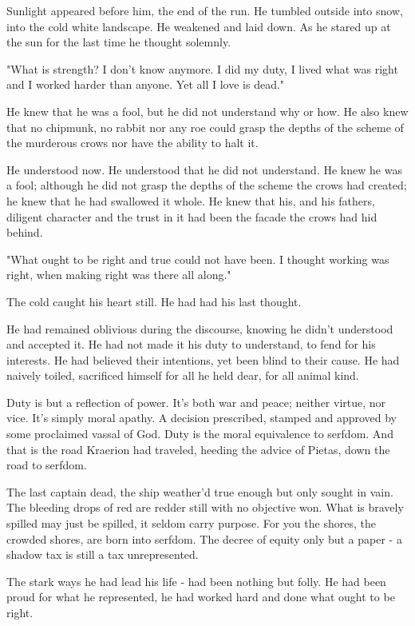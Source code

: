 \documentclass[smalldemyvopaper,11pt,twoside,onecolumn,openright,extrafontsizes]{memoir}
\newlength\drop
\begin{document}
Sunlight appeared before him, the end of the run. He tumbled outside into snow, into the cold white landscape. He weakened and laid down. As he stared up at the sun for the last time he thought solemnly.

"What is strength? I don't know anymore. I did my duty, I lived what was right and I worked harder than anyone. Yet all I love is dead."

He knew that he was a fool, but he did not understand why or how. He also knew that no chipmunk, no rabbit nor any roe could grasp the depths of the scheme of the murderous crows nor have the ability to halt it.

He understood now. He understood that he did not understand. He knew he was a fool; although he did not grasp the depths of the scheme the crows had created; he knew that he had swallowed it whole. 
He knew that his, and his fathers, diligent character and the trust in it had been the facade the crows had hid behind.

"What ought to be right and true could not have been. I thought working was right, when making right was there all along."

The cold caught his heart still. He had had his last thought. 

He had remained oblivious during the discourse, knowing he didn't understood and accepted it. He had not made it his duty to understand, to fend for his interests. He had believed their intentions, yet been blind to their cause. He had naively toiled, sacrificed himself for all he held dear, for all animal kind. 

Duty is but a reflection of power. It's both war and peace; neither virtue, nor vice. It's simply moral apathy. A decision prescribed, stamped and approved by some proclaimed vassal of God. Duty is the moral equivalence to serfdom. And that is the road Kraerion had traveled, heeding the advice of Pietas, down the road to serfdom.

The last captain dead, the ship weather'd true enough but only sought in vain. The bleeding drops of red are redder still with no objective won. What is bravely spilled may just be spilled, it seldom carry purpose. For you the shores, the crowded shores, are born into serfdom. The decree of equity only but a paper - a shadow tax is still a tax unrepresented.

The stark ways he had lead his life - had been nothing but folly. He had been proud for what he represented, he had worked hard and done what ought to be right. 
\end{document}

